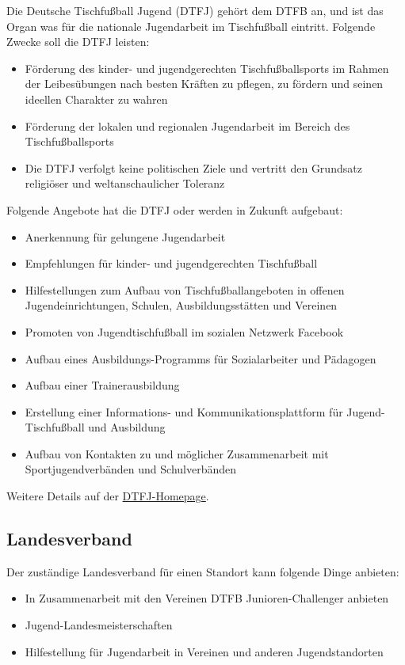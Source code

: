 Die Deutsche Tischfußball Jugend (DTFJ) gehört dem DTFB an, und ist das Organ was für die nationale Jugendarbeit im Tischfußball eintritt.  
Folgende Zwecke soll die DTFJ leisten: 
\begin{itemize}
\item Förderung des kinder- und jugendgerechten Tischfußballsports im Rahmen der Leibesübungen nach besten Kräften zu pflegen, zu fördern und seinen ideellen Charakter zu wahren
\item Förderung der lokalen und regionalen Jugendarbeit im Bereich des Tischfußballsports
\item Die DTFJ verfolgt keine politischen Ziele und vertritt den Grundsatz religiöser und weltanschaulicher Toleranz
\end{itemize}
Folgende Angebote hat die DTFJ oder werden in Zukunft aufgebaut:
\begin{itemize}
\item Anerkennung für gelungene Jugendarbeit
\item Empfehlungen für kinder- und jugendgerechten Tischfußball 
\item Hilfestellungen zum Aufbau von Tischfußballangeboten in offenen Jugendeinrichtungen, Schulen, Ausbildungsstätten und Vereinen
\item Promoten von Jugendtischfußball im sozialen Netzwerk Facebook
\item Aufbau eines Ausbildungs-Programms für Sozialarbeiter und Pädagogen 
\item Aufbau einer Trainerausbildung
\item Erstellung einer Informations- und Kommunikationsplattform für 
Jugend-Tischfußball und Ausbildung
\item Aufbau von Kontakten zu und möglicher Zusammenarbeit mit Sportjugendverbänden und Schulverbänden
\end{itemize}

Weitere Details auf der \href{http://www.dtfj.de/}{DTFJ-Homepage}.

\subsection{Landesverband}
\label{jugend:kontakte:landesverband}

Der zuständige Landesverband für einen Standort kann folgende Dinge anbieten:
\begin{itemize}
\item In Zusammenarbeit mit den Vereinen DTFB Junioren-Challenger anbieten
\item Jugend-Landesmeisterschaften 
\item Hilfestellung für Jugendarbeit in Vereinen und anderen Jugendstandorten
\end{itemize}


